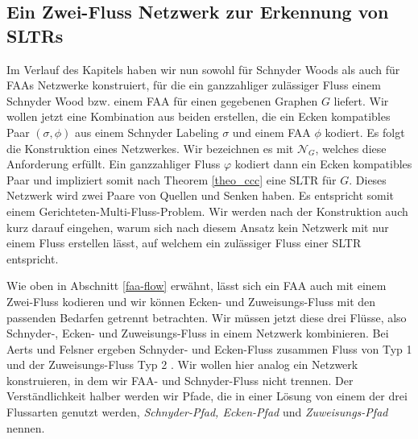 \subsection{Ein Zwei-Fluss Netzwerk zur Erkennung von SLTRs}

Im Verlauf des Kapitels haben wir nun sowohl für Schnyder Woods als auch für FAAs Netzwerke konstruiert, für die ein ganzzahliger zulässiger Fluss einem Schnyder Wood bzw. einem FAA für einen gegebenen Graphen $G$ liefert. Wir wollen jetzt eine Kombination aus beiden erstellen, die ein Ecken kompatibles Paar $(\sigma,\phi)$ aus einem Schnyder Labeling $\sigma$ und einem FAA $\phi$  kodiert. Es folgt die Konstruktion eines Netzwerkes. Wir bezeichnen es mit $\mathcal{N}_G$, welches diese Anforderung erfüllt. Ein ganzzahliger Fluss $\varphi$ kodiert dann ein Ecken kompatibles Paar und impliziert somit nach Theorem \ref{theo_ccc} eine SLTR für $G$. Dieses Netzwerk wird zwei Paare von Quellen und Senken haben. Es entspricht somit einem Gerichteten-Multi-Fluss-Problem. Wir werden nach der Konstruktion auch kurz darauf eingehen, warum sich nach diesem Ansatz kein Netzwerk mit nur einem Fluss erstellen lässt, auf welchem ein zulässiger Fluss einer SLTR entspricht.

Wie oben in Abschnitt \ref{faa-flow} erwähnt, lässt sich ein FAA auch mit einem Zwei-Fluss kodieren und wir können Ecken- und Zuweisungs-Fluss mit den passenden Bedarfen getrennt betrachten. Wir müssen jetzt diese drei Flüsse, also Schnyder-, Ecken- und Zuweisungs-Fluss in einem Netzwerk kombinieren. Bei Aerts und Felsner ergeben Schnyder- und Ecken-Fluss zusammen Fluss von Typ 1 und der Zuweisungs-Fluss Typ 2 \cite{af15}. Wir wollen hier analog ein Netzwerk konstruieren, in dem wir FAA- und Schnyder-Fluss nicht trennen. Der Verständlichkeit halber werden wir Pfade, die in einer Lösung von einem der drei Flussarten genutzt werden, \textit{Schnyder-Pfad, Ecken-Pfad} und \textit{Zuweisungs-Pfad} nennen.

